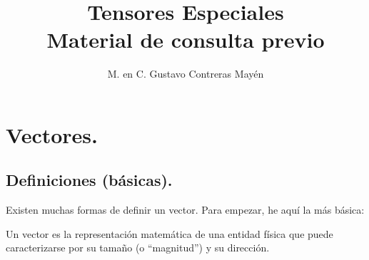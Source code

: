 \documentclass[hidelinks,12pt]{article}
\title{Tensores Especiales\\ \large{Material de consulta previo}\vspace{-3ex}}
\author{M. en C. Gustavo Contreras Mayén}
\date{ }
\begin{document}
\vspace{-4cm}
\maketitle
\fontsize{14}{14}\selectfont
\tableofcontents
\newpage


\section{Vectores.}

\subsection{Definiciones (básicas).}

Existen muchas formas de definir un vector. Para empezar, he aquí la más básica:

\begin{tcolorbox}
Un vector es la representación matemática de una entidad física que puede caracterizarse por su tamaño (o \enquote{magnitud}) y su dirección.
\end{tcolorbox}
\end{document}
